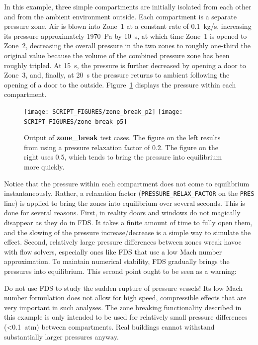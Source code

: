 \documentclass[11pt]{book}
\newcommand{\ct}{\tt\small}
\begin{document}
In this example, three simple compartments are initially isolated from each other and from the ambient environment outside. Each compartment is a separate pressure zone. Air
is blown into Zone~1 at a constant rate of 0.1~kg/s, increasing its pressure approximately 1970~Pa by 10~s, at which time Zone~1 is opened to Zone~2, decreasing the
overall pressure in the two zones to roughly one-third the original value because the volume of the combined pressure zone has been roughly tripled.
At 15~s, the pressure is further decreased by opening a door to Zone~3, and, finally, at 20~s the pressure returns to ambient following the opening
of a door to the outside. Figure~\ref{zone_break} displays the pressure within each compartment.

\begin{figure}[ht]
\texttt{[image: SCRIPT\_FIGURES/zone\_break\_p2]}
\texttt{[image: SCRIPT\_FIGURES/zone\_break\_p5]}
\caption[Output of {\bf zone\_break} test cases.]{Output of {\bf zone\_break} test cases. The figure on the left results from using a pressure relaxation factor of 0.2. The
figure on the right uses 0.5, which tends to bring the pressure into equilibrium more quickly.}
\label{zone_break}
\end{figure}

\noindent
Notice that the pressure within each compartment does not come to equilibrium instantaneously. Rather, a relaxation factor ({\ct PRESSURE\_RELAX\_FACTOR} on the {\ct PRES} line)
is applied to bring the zones
into equilibrium over several seconds. This is done for several reasons. First, in reality doors and windows do not magically disappear as they do in FDS. It takes
a finite amount of time to fully open them, and the slowing of the pressure increase/decrease is a simple way to simulate the effect.
Second, relatively large pressure differences between zones wreak havoc with flow solvers, especially ones like FDS that
use a low Mach number approximation. To maintain numerical stability, FDS gradually brings the pressures into equilibrium. This second point ought to be seen as a warning:

\begin{warning}
\noindent Do not use FDS to study the sudden rupture of pressure vessels! Its low Mach number formulation does not allow for high speed, compressible effects that
are very important in such analyses. The zone breaking functionality described in this example is only intended to be used for relatively small pressure differences (<0.1~atm)
between compartments. Real buildings cannot withstand substantially larger pressures anyway.
\end{warning}
\end{document}
